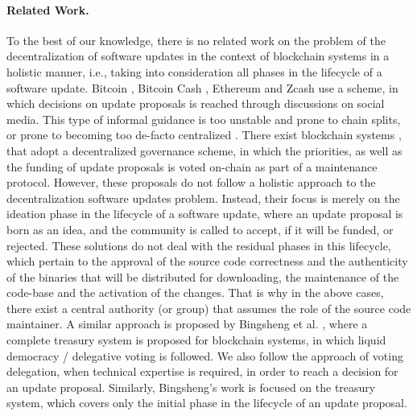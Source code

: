 \paragraph{Related Work.}
To the best of our knowledge, there is no related work on the problem of the decentralization of software updates in the context of blockchain systems in a holistic manner, i.e., taking into consideration all phases in the lifecycle of a software update. 
Bitcoin \cite{bitcoin}, Bitcoin Cash , Ethereum \cite{ethereum} and Zcash  use a  scheme, in which decisions on update proposals is reached through discussions on social media. This type of informal guidance is  too unstable and prone to chain splits, or prone to becoming too de-facto centralized \cite{buterin_on_gov}. There exist blockchain systems \cite{dash}, \cite{decred} that adopt a decentralized governance scheme, in which the priorities, as well as the funding of update proposals is voted on-chain as part of a maintenance protocol. However, these proposals do not follow a holistic approach to the decentralization software updates problem. Instead, their focus is merely on the ideation phase in the lifecycle of a software update, where an update proposal is born as an idea, and the community is called to accept, if it will be funded, or rejected. These solutions do not deal with the residual phases in this lifecycle, which pertain to the approval of the source code correctness and the authenticity of the binaries that will be distributed for downloading, the maintenance of the code-base and the activation of the changes. That is why in the above cases, there exist a central authority (or group) that assumes the role of the source code maintainer. A similar approach is proposed by Bingsheng et al. \cite{cryptoeprint:2018:435}, where a complete treasury system is proposed for blockchain systems, in which liquid democracy / delegative voting is followed. We also follow the approach of voting delegation, when technical expertise is required, in order to reach a decision for an update proposal. Similarly, Bingsheng's work is focused  on the treasury system, which covers only the initial phase in the lifecycle of an update proposal.


%
